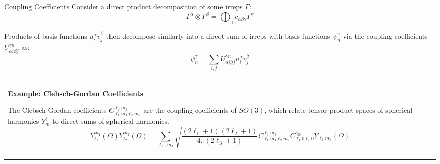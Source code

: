 \documentclass[11pt]{beamer}
\newenvironment{boxed2}
    {\begin{center}
    \begin{tabular}{|p{0.95\textwidth}|}
    \hline\\
    }
    { 
    \\\\\hline
    \end{tabular} 
    \end{center}
    }
\begin{document}
\begin{frame}{Coupling Coefficients}
Consider a direct product decomposition of some irreps $\Gamma$:
$$
\Gamma^{\alpha}\otimes\Gamma^{\beta}=\bigoplus_{\gamma}c_{\alpha\beta\gamma}\Gamma^{\gamma}
$$
	
Products of basis functions $u^{\alpha}_iv^{\beta}_j$ then decompose similarly into a direct sum of irreps with basis functions $\psi_{n}^{\gamma}$ via the coupling coefficients $U_{\alpha i \beta j}^{\gamma n}$ as:
$$
\psi_{n}^{\gamma}= \sum_{i,j}U_{\alpha i \beta j}^{\gamma n}u^{\alpha}_iv^{\beta}_j
$$

	\begin{boxed2}\tiny
	
	\vspace{-.61cm}
	
	\textbf{Example: Clebsch-Gordan Coefficients} 
	
	The Clebsch-Gordan coefficients $C^{\ell_f  m_f}_{\ell_1  m_1\ell_2 m_2}$ are the coupling coefficients of $SO(3)$, which relate tensor product spaces of spherical harmonics $Y^{\ell}_m$ to direct sums of spherical harmonics.
	$$
	Y_{\ell_1}^{m_1}(\Omega)Y_{\ell_2}^{m_2}(\Omega)=\sum_{\ell_3, m_3}\sqrt{\frac{(2\ell_1+1)(2\ell_2+1)}{4\pi(2\ell_3+1)}}C^{\ell_3m_3}_{\ell_1m_1\ell_2m_2}C^{\ell_30}_{\ell_1 0\ell_2 0}Y_{\ell_3m_3}(\Omega)
	$$
	
	\vspace{-.3cm}
	
\end{boxed2}

\end{frame}
\end{document}
